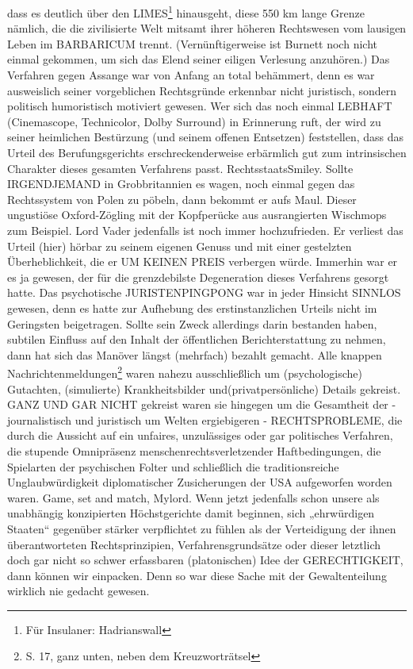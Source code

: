\begin{multicols}{2}
{dass es deutlich über den LIMES\footnote[33]{Für Insulaner: Hadrianswall}
hinausgeht, diese 550 km lange Grenze nämlich, die die zivilisierte Welt
mitsamt ihrer höheren Rechtswesen vom lausigen Leben im BARBARICUM trennt.
(Vernünftigerweise ist Burnett noch nicht einmal gekommen, um sich das Elend
seiner eiligen Verlesung anzuhören.)\textCR
Das Verfahren gegen Assange war von Anfang an total behämmert, denn es war
ausweislich seiner vorgeblichen Rechtsgründe erkennbar nicht juristisch,
sondern politisch humoristisch motiviert gewesen. Wer sich das noch einmal
LEBHAFT (Cinemascope, Technicolor, Dolby Surround) in Erinnerung ruft, der wird
zu seiner heimlichen Bestürzung (und seinem offenen Entsetzen) feststellen,
dass das Urteil des Berufungsgerichts erschreckenderweise erbärmlich gut zum
intrinsischen Charakter dieses gesamten Verfahrens passt. RechtsstaatsSmiley.\textCR
Sollte IRGENDJEMAND in Grobbritannien es wagen, noch einmal gegen das
Rechtssystem von Polen zu pöbeln, dann bekommt er aufs Maul. Dieser ungustiöse
Oxford-Zögling mit der Kopfperücke aus ausrangierten Wischmops zum Beispiel.\textCR
Lord Vader jedenfalls ist noch immer hochzufrieden. Er verliest das Urteil
(hier) hörbar zu seinem eigenen Genuss und mit einer gestelzten
Überheblichkeit, die er UM KEINEN PREIS verbergen würde. Immerhin war er es ja
gewesen, der für die grenzdebilste Degeneration dieses Verfahrens gesorgt
hatte. Das psychotische JURISTENPINGPONG war in jeder Hinsicht SINNLOS gewesen,
denn es hatte zur Aufhebung des erstinstanzlichen Urteils nicht im Geringsten
beigetragen. Sollte sein Zweck allerdings darin bestanden haben, subtilen
Einfluss auf den Inhalt der öffentlichen Berichterstattung zu nehmen, dann hat
sich das Manöver längst (mehrfach) bezahlt gemacht. Alle knappen
Nachrichtenmeldungen\footnote[34]{S. 17, ganz unten, neben dem Kreuzworträtsel}
waren nahezu ausschließlich um (psychologische) Gutachten,
(simulierte) Krankheitsbilder und(privatpersönliche) Details gekreist. GANZ UND
GAR NICHT gekreist waren sie hingegen um die Gesamtheit der - journalistisch
und juristisch um Welten ergiebigeren - RECHTSPROBLEME, die durch die Aussicht
auf ein unfaires, unzulässiges oder gar politisches Verfahren, die stupende
Omnipräsenz menschenrechtsverletzender Haftbedingungen, die Spielarten der
psychischen Folter und schließlich die traditionsreiche Unglaubwürdigkeit
diplomatischer Zusicherungen der USA aufgeworfen worden waren. Game, set and
match, Mylord.\textCR
Wenn jetzt jedenfalls schon unsere als unabhängig konzipierten Höchstgerichte
damit beginnen, sich „ehrwürdigen Staaten“ gegenüber stärker verpflichtet zu
fühlen als der Verteidigung der ihnen überantworteten Rechtsprinzipien,
Verfahrensgrundsätze oder dieser letztlich doch gar nicht so schwer
erfassbaren (platonischen) Idee der GERECHTIGKEIT, dann können wir einpacken.\textCR
Denn so war diese Sache mit der Gewaltenteilung wirklich nie gedacht gewesen.}




\end{multicols}
